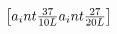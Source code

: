 \begin{align}\label{cub}
\begin{bmatrix}{{ a_int }}\frac{37}{10L}{%
	{%
	{{ a_int }}\frac{27}{20L} {%
	{%
}}}}
\end{bmatrix}
\end{align}
